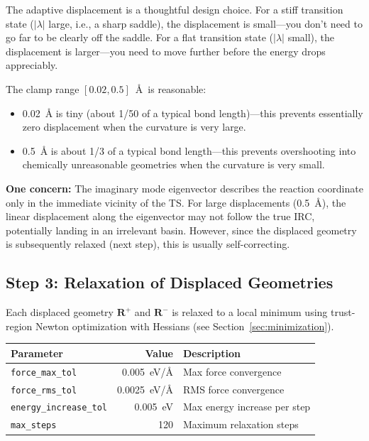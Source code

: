 \documentclass[11pt,a4paper]{article}
\begin{document}
\begin{evaluation}
The adaptive displacement is a thoughtful design choice. For a stiff transition state ($|\lambda|$ large, i.e., a sharp saddle), the displacement is small---you don't need to go far to be clearly off the saddle. For a flat transition state ($|\lambda|$ small), the displacement is larger---you need to move further before the energy drops appreciably.

The clamp range $[0.02, 0.5]$~\AA\ is reasonable:
\begin{itemize}
    \item \SI{0.02}{\angstrom} is tiny (about 1/50 of a typical bond length)---this prevents essentially zero displacement when the curvature is very large.
    \item \SI{0.5}{\angstrom} is about 1/3 of a typical bond length---this prevents overshooting into chemically unreasonable geometries when the curvature is very small.
\end{itemize}

\textbf{One concern:} The imaginary mode eigenvector describes the reaction coordinate only in the immediate vicinity of the TS. For large displacements (\SI{0.5}{\angstrom}), the linear displacement along the eigenvector may not follow the true IRC, potentially landing in an irrelevant basin. However, since the displaced geometry is subsequently relaxed (next step), this is usually self-correcting.
\end{evaluation}

\subsection{Step 3: Relaxation of Displaced Geometries}

Each displaced geometry $\mathbf{R}^+$ and $\mathbf{R}^-$ is relaxed to a local minimum using trust-region Newton optimization with Hessians (see Section~\ref{sec:minimization}).

\begin{threshbox}
\begin{tabular}{lrl}
\toprule
Parameter & Value & Description \\
\midrule
\texttt{force\_max\_tol} & \SI{0.005}{eV/\angstrom} & Max force convergence \\
\texttt{force\_rms\_tol} & \SI{0.0025}{eV/\angstrom} & RMS force convergence \\
\texttt{energy\_increase\_tol} & \SI{0.005}{eV} & Max energy increase per step \\
\texttt{max\_steps} & 120 & Maximum relaxation steps \\
\bottomrule
\end{tabular}
\end{threshbox}
\end{document}
